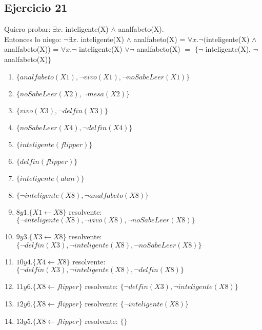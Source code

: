 \documentclass[10pt,a4paper]{article}
\begin{document}
\subsection{Ejercicio 21}
    Quiero probar: $\exists x.$ inteligente(X) $\wedge$ analfabeto(X). \\
    Entonces lo niego: $\neg \exists x.$ inteligente(X) $\wedge$ analfabeto(X) = $\forall x. \neg ($inteligente(X) $\wedge$ analfabeto(X)) = $\forall x. \neg$ inteligente(X) $\vee \neg$ analfabeto(X) $=$ $\{ \neg$ inteligente(X), $\neg$ analfabeto(X)$\}$
    \begin{enumerate}
        \item $\{analfabeto(X1), \neg vivo(X1), \neg noSabeLeer(X1) \}$
        \item $\{noSabeLeer(X2), \neg mesa(X2)\}$
        \item $\{vivo(X3), \neg delfin(X3) \}$
        \item $\{noSabeLeer(X4), \neg delfin(X4)\}$
        \item $\{inteligente(flipper)\}$
        \item $\{delfin(flipper)\}$
        \item $\{inteligente(alan)\}$
        \item $\{ \neg inteligente(X8), \neg analfabeto(X8)\}$
        \item $8y1. \{X1 \leftarrow X8 \}$ resolvente: $\{ \neg inteligente(X8), \neg vivo(X8), \neg noSabeLeer(X8) \}$
        \item $9y3. \{X3 \leftarrow X8\}$ resolvente: $\{ \neg delfin(X3),\neg inteligente(X8), \neg noSabeLeer(X8)\}$
        \item $10y4.\{X4 \leftarrow X8\}$ resolvente: $\{ \neg delfin(X3),\neg inteligente(X8), \neg delfin(X8)\}$
        \item $11y6.\{X8 \leftarrow flipper\}$ resolvente: $\{ \neg delfin(X3),\neg inteligente(X8)\}$
        \item $12y6. \{X8 \leftarrow flipper\}$ resolvente: $\{ \neg inteligente(X8)\}$
        \item $13y5. \{X8 \leftarrow flipper\}$ resolvente: $\{\}$
    \end{enumerate}
\end{document}
